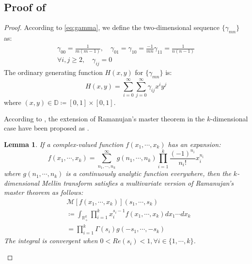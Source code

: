 \documentclass{article}
\newtheorem{lemma}{Lemma}[section]
\begin{document}
\subsection{Proof of }\label{proof:gamma_c}
\begin{proof}
According to \eqref{eq:gamma}, we define the two-dimensional sequence $\{\gamma_{mn}\}$ as:
\begin{equation}
    \begin{gathered}
        \gamma_{00} = \frac{1}{m(m-1)}, \quad \gamma_{01} = \gamma_{10} = \frac{-1}{mn} \gamma_{11} = \frac{1}{n(n-1)} \\
        \forall i, j \geq 2, \quad \gamma_{ij} = 0
    \end{gathered}
\end{equation}
The ordinary generating function $H(x, y)$ for $\{\gamma_{mn}\}$ is:
\begin{equation}
    H(x, y) = \sum_{i=0}^{\infty}\sum_{j=0}^{\infty}\gamma_{ij}x^iy^j
\end{equation}
where $(x, y) \in \mathbb{D} \coloneqq [0, 1]\times [0, 1]$.

According to \cite{bradshaw2023operational,amdeberhan2012ramanujan}, the extension of Ramanujan's master theorem in the $k$-dimensional case have been proposed as .
\begin{lemma}\label{le:MultiRam}
    If a complex-valued function $f(x_1, \cdots, x_k)$ has an expansion:
    \begin{equation}
        f(x_1, \cdots, x_k) = \sum_{n_1, \cdots, n_k}^{\infty} g(n_1, \cdots, n_k) \prod_{i=1}^k \frac{(-1)^{n_i}}{n_i!} x_i^{n_i}
    \end{equation}
    where $g(n_1, \cdots, n_k)$ is a continuously analytic function everywhere, 
    then the $k$-dimensional Mellin transform satisfies a multivariate version of Ramanujan's master theorem as follows:
    \begin{equation}
        \begin{aligned}
            & \mathcal{M}[f(x_1, \cdots, x_k)](s_1, \cdots, s_k) \\
            & \coloneqq \int_{\mathbb{R}_+^k} \prod_{i=1}^{k} x_i^{s_i-1} f(x_1, \cdots, x_k) dx_1 \cdots dx_k \\
            & = \prod_{i=1}^{k} \Gamma(s_i)g(-s_1, \cdots, -s_k)
        \end{aligned}
    \end{equation}
    The integral is convergent when $0 < Re(s_i) <1, \forall i \in \{1,\cdots,k\}$.
\end{lemma}


\end{proof}
\end{document}
